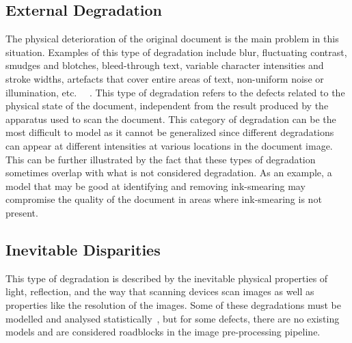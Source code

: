 \documentclass[a4paper, 12pt]{report}
\begin{document}
\subsection{External Degradation}
The physical deterioration of the original document is the main problem in this
situation. Examples of this type of degradation include blur, fluctuating
contrast, smudges and blotches, bleed-through text, variable character
intensities and stroke widths, artefacts that cover entire areas of text,
non-uniform noise or illumination, etc.~\cite{gatos2006adaptive}
~\cite{ait2022innovative}. This type of degradation refers to the defects
related to the physical state of the document, independent from the result
produced by the apparatus used to scan the document. This category of
degradation can be the most difficult to model as it cannot be generalized
since different degradations can appear at different intensities at various
locations in the document image. This can be further illustrated by the fact
that these types of degradation sometimes overlap with what is not considered
degradation. As an example, a model that may be good at identifying and
removing ink-smearing may compromise the quality of the document in areas where
ink-smearing is not present.

\subsection{Inevitable Disparities}
This type of degradation is described by the inevitable physical properties of
light, reflection, and the way that scanning devices scan images as well as
properties like the resolution of the images. Some of these degradations must
be modelled and analysed statistically~\cite{Baird2007}, but for some defects,
there are no existing models and are considered roadblocks in the image
pre-processing pipeline.
\end{document}
